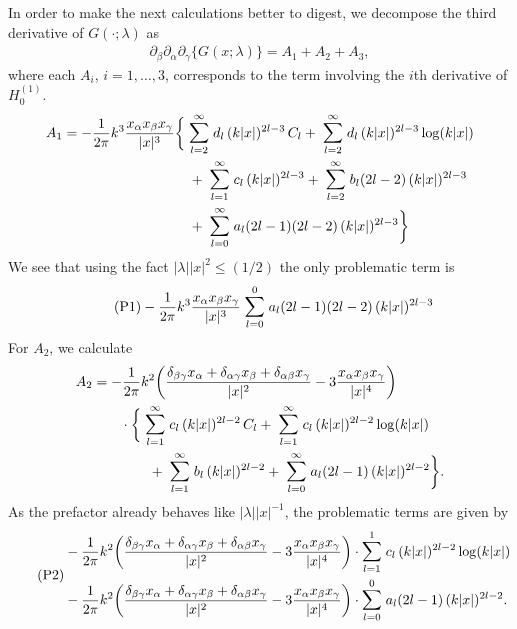 In order to make the next calculations better to digest, we decompose the third derivative of $G(\cdot; \lambda)$ as 
\begin{align*}
  \partial_\beta \partial_\alpha \partial_\gamma \big\{G(x; \lambda)\big\}
  = A_1 + A_2 + A_3,
\end{align*}
where each $A_i$, $i = 1,\dots,3$, corresponds to the term involving the $i$th derivative of $H_0^{(1)}$.
\begin{align*}
  A_1 = - \frac{1}{2 \pi } k^3 \frac{x_\alpha x_\beta x_\gamma}{|x|^3} 
  &\bigg\{
     \; \mathlarger{\sum}_{l = 2}^\infty \; d_l \, (k|x|)^{2l - 3} \, C_l + \; \mathlarger{\sum}_{l = 2}^\infty \; d_l \, (k|x|)^{2l - 3} \log(k|x|)  \\
  &\quad  + \; \mathlarger{\sum}_{l = 1}^\infty \; c_l \, (k|x|)^{2l - 3} + \; \mathlarger{\sum}_{l = 2}^\infty \; b_l (2l - 2) \, (k|x|)^{2l - 3} \\
  &\quad + \; \mathlarger{\sum}_{l = 0}^\infty \; a_l (2l - 1) (2l - 2) \, (k|x|)^{2l - 3} 
  \bigg\}
\end{align*}
We see that using the fact $|\lambda| |x|^2 \leq (1/2)$ the only problematic term is
\begin{align}
  \label{eq:P1}
  \tag{P1}- \frac{1}{2 \pi } k^3 \frac{x_\alpha x_\beta x_\gamma}{|x|^3}  \; \mathlarger{\sum}_{l = 0}^{0} \; a_l (2l - 1) (2l - 2) \, (k|x|)^{2l - 3} 
\end{align}
For $A_2$, we calculate
\begin{align*}
  A_2 &= - \frac{1}{2\pi} k^2 \bigg(\frac{\delta_{\beta\gamma} x_\alpha + \delta_{\alpha \gamma} x_\beta + \delta_{\alpha \beta} x_\gamma}{|x|^2} - 3 \frac{x_\alpha x_\beta x_\gamma}{|x|^4} \bigg) \\ 
  &\qquad \cdot 
  \bigg\{
    \; \mathlarger{\sum}_{l = 1}^\infty \; c_l \, (k|x|)^{2l - 2} \, C_l 
  + \; \mathlarger{\sum}_{l = 1}^\infty \; c_l \, (k|x|)^{2l - 2} \log(k|x|) \\
  &\qquad\qquad+ \; \mathlarger{\sum}_{l = 1}^\infty \; b_l \, (k|x|)^{2l - 2} 
  + \; \mathlarger{\sum}_{l = 0}^\infty \; a_l (2l - 1) \, (k|x|)^{2l - 2} 
  \bigg\}.
\end{align*}
As the prefactor already behaves like $|\lambda| |x|^{-1}$, the problematic terms are given by
\begin{align}
  \label{eq:P2}
  \tag{P2}
  \begin{alignedat}{1}
  & - \frac{1}{2\pi} k^2 \bigg(\frac{\delta_{\beta\gamma} x_\alpha + \delta_{\alpha \gamma} x_\beta + \delta_{\alpha \beta} x_\gamma}{|x|^2} - 3 \frac{x_\alpha x_\beta x_\gamma}{|x|^4} \bigg) 
   \cdot \mathlarger{\sum}_{l = 1}^1 \; c_l \, (k|x|)^{2l - 2} \log(k|x|) \\
   &- \frac{1}{2\pi} k^2 \bigg(\frac{\delta_{\beta\gamma} x_\alpha + \delta_{\alpha \gamma} x_\beta + \delta_{\alpha \beta} x_\gamma}{|x|^2} - 3 \frac{x_\alpha x_\beta x_\gamma}{|x|^4} \bigg) 
  \cdot \mathlarger{\sum}_{l = 0}^0 \; a_l (2l - 1) \, (k|x|)^{2l - 2} .
  \end{alignedat}
\end{align}
